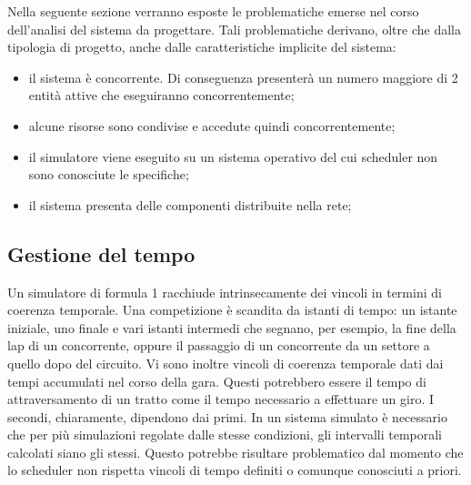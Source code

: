Nella seguente sezione verranno esposte le problematiche emerse nel corso
dell'analisi del sistema da progettare. Tali
problematiche derivano, oltre che dalla tipologia di progetto, anche dalle
caratteristiche implicite del sistema:
\begin{itemize}
\item il sistema è concorrente. Di conseguenza presenterà un numero maggiore di
2 entità attive
che eseguiranno concorrentemente;
\item alcune risorse sono condivise e accedute quindi concorrentemente;
\item il simulatore viene eseguito su un sistema operativo del cui scheduler non
sono conosciute le specifiche;
\item il sistema presenta delle componenti distribuite nella rete;
\end{itemize}
\subsection{Gestione del tempo}
Un simulatore di formula 1 racchiude intrinsecamente dei vincoli in termini di
coerenza temporale. 
Una competizione è scandita da istanti di tempo: un istante iniziale, uno finale
e vari istanti 
intermedi che segnano, per esempio, la fine della lap di un concorrente, oppure
il passaggio di un concorrente da un settore
a quello dopo del circuito. Vi sono inoltre vincoli di coerenza temporale dati
dai tempi accumulati nel corso
della gara. Questi potrebbero essere il tempo di attraversamento di un tratto
come il tempo necessario
a effettuare un giro. I secondi, chiaramente, dipendono dai primi. 
In un sistema simulato è necessario che per più simulazioni regolate dalle
stesse condizioni, 
gli intervalli temporali calcolati siano gli stessi. Questo potrebbe risultare
problematico dal momento che
lo scheduler non rispetta vincoli di tempo definiti o comunque conosciuti a
priori.
